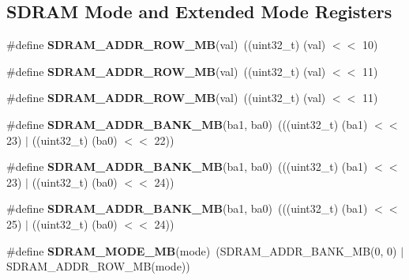 \subsection*{S\+D\+R\+AM Mode and Extended Mode Registers}
\begin{DoxyCompactItemize}
\item 
\mbox{\label{group__lpc__emc_gac6c97a11ed392a9051b03381497500eb}} 
\#define {\bfseries S\+D\+R\+A\+M\+\_\+\+A\+D\+D\+R\+\_\+\+R\+O\+W\+\_\+MB}(val)~((uint32\+\_\+t) (val) $<$$<$ 10)
\item 
\mbox{\label{group__lpc__emc_ga900b3677b8aa9c43900cf2805b740955}} 
\#define {\bfseries S\+D\+R\+A\+M\+\_\+\+A\+D\+D\+R\+\_\+\+R\+O\+W\+\_\+MB}(val)~((uint32\+\_\+t) (val) $<$$<$ 11)
\item 
\mbox{\label{group__lpc__emc_ga7fafbb74cdb0d52f88bbae52c4c5d134}} 
\#define {\bfseries S\+D\+R\+A\+M\+\_\+\+A\+D\+D\+R\+\_\+\+R\+O\+W\+\_\+MB}(val)~((uint32\+\_\+t) (val) $<$$<$ 11)
\item 
\mbox{\label{group__lpc__emc_ga754cce80e5c78d66046df68663a2be87}} 
\#define {\bfseries S\+D\+R\+A\+M\+\_\+\+A\+D\+D\+R\+\_\+\+B\+A\+N\+K\+\_\+MB}(ba1,  ba0)~(((uint32\+\_\+t) (ba1) $<$$<$ 23) $\vert$ ((uint32\+\_\+t) (ba0) $<$$<$ 22))
\item 
\mbox{\label{group__lpc__emc_ga6febb9d6b03048143311025a9c65b058}} 
\#define {\bfseries S\+D\+R\+A\+M\+\_\+\+A\+D\+D\+R\+\_\+\+B\+A\+N\+K\+\_\+MB}(ba1,  ba0)~(((uint32\+\_\+t) (ba1) $<$$<$ 23) $\vert$ ((uint32\+\_\+t) (ba0) $<$$<$ 24))
\item 
\mbox{\label{group__lpc__emc_gacb15d202e5fab0f66f1a6dc69fc99e46}} 
\#define {\bfseries S\+D\+R\+A\+M\+\_\+\+A\+D\+D\+R\+\_\+\+B\+A\+N\+K\+\_\+MB}(ba1,  ba0)~(((uint32\+\_\+t) (ba1) $<$$<$ 25) $\vert$ ((uint32\+\_\+t) (ba0) $<$$<$ 24))
\item 
\mbox{\label{group__lpc__emc_ga1754f46c0d6ba970db94a721128dac95}} 
\#define {\bfseries S\+D\+R\+A\+M\+\_\+\+M\+O\+D\+E\+\_\+MB}(mode)~(S\+D\+R\+A\+M\+\_\+\+A\+D\+D\+R\+\_\+\+B\+A\+N\+K\+\_\+MB(0, 0) $\vert$ S\+D\+R\+A\+M\+\_\+\+A\+D\+D\+R\+\_\+\+R\+O\+W\+\_\+MB(mode))
$$
\end{DoxyCompactItemize}
